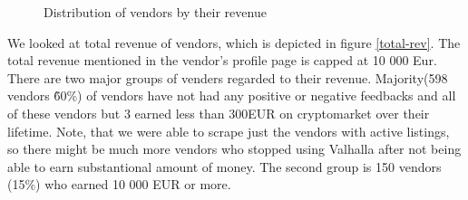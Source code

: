 \documentclass[
  digital, %
  table,   %
  lof,     %
  lot,     %
  oneside
]{fithesis3}
\begin{document}
\begin{figure}[!htb]

    
\caption{Distribution  of vendors by their revenue}
\end{figure}

We looked at total revenue of vendors, which is depicted in figure \ref{total-rev}. 
The total revenue mentioned in the vendor's profile page is capped at 10 000 Eur.
There are two major groups of venders regarded to their revenue. 
Majority(598 vendors \~ 60\%) of vendors have not had any positive or negative feedbacks and all of these vendors
but 3 earned less than 300EUR on cryptomarket over their lifetime.
Note, that we were able to scrape just the vendors with active listings,
so there might be much more vendors who stopped using Valhalla after
not being able to earn substantional amount of money.
The second group is 150 vendors (15\%) who earned 10 000 EUR or more.
\end{document}
